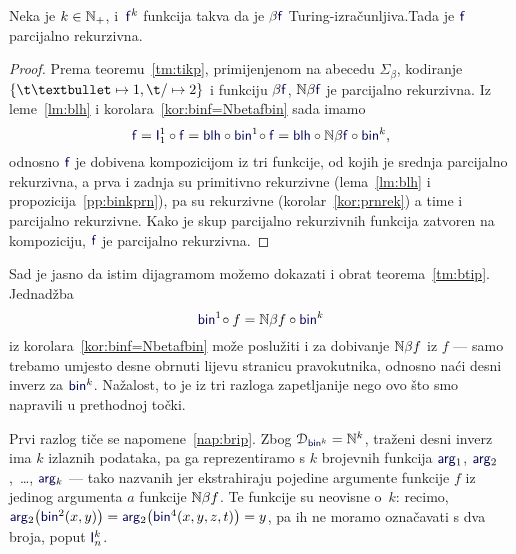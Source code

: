 
\begin{teorem}[{name=[parcijalna rekurzivnost Turing-izračunljivih brojevnih funkcija]}]\label{tm:btip}
Neka je $k\in{\mathbb N}_+$, i\, $\f f^k$\! funkcija takva da je $\beta\f f$ Turing-izračunljiva.\newline Tada je $\f f$ parcijalno rekurzivna.
\end{teorem}
\begin{proof}
    Prema teoremu~\ref{tm:tikp}, primijenjenom na abecedu $\Sigma_\beta$, kodiranje $\{\t\textbullet\mapsto1,\t/\mapsto2\}$ i funkciju $\beta\f f$, $\N\beta\f f$ je parcijalno rekurzivna. Iz leme~\ref{lm:blh} i korolara~\ref{kor:binf=Nbetafbin} sada imamo
\begin{equation}
    \f f=\f I_1^1\circ\f f=\f{blh}\circ\f{bin}^1\!\circ\f f=\f{blh}\circ\N\beta\f f\circ\f{bin}^k\text,
\end{equation}
odnosno $\f f$ je dobivena kompozicijom iz tri funkcije, od kojih je srednja parcijalno rekurzivna, a prva i zadnja su primitivno rekurzivne (lema~\ref{lm:blh} i propozicija~\ref{pp:binkprn}), pa su rekurzivne (korolar~\ref{kor:prnrek}) a time i parcijalno rekurzivne. Kako je skup parcijalno rekurzivnih funkcija zatvoren na kompoziciju, $\f f$ je parcijalno rekurzivna.
\end{proof}

Sad je jasno da istim dijagramom možemo dokazati i obrat teorema~\ref{tm:btip}. Jednadžba
\begin{equation}
    \f{bin}^1\!\circ f=\N\beta f\circ\f{bin}^k
\end{equation}
iz korolara~\ref{kor:binf=Nbetafbin} može poslužiti i za dobivanje ${\mathbb N}\beta f$ iz $f$ --- samo trebamo umjesto desne obrnuti lijevu stranicu pravokutnika, odnosno naći desni inverz za $\f{bin}^k$. Nažalost, to je iz tri razloga zapetljanije nego ovo što smo napravili u prethodnoj točki.

Prvi razlog tiče se napomene~\ref{nap:brip}. Zbog $\dom{\f{bin}^k}=\N^k$, traženi desni inverz ima $k$ izlaznih podataka, pa ga reprezentiramo s $k$ brojevnih funkcija $\f{arg}_1$, $\f{arg}_2$,~\ldots, $\f{arg}_k$ --- tako nazvanih jer ekstrahiraju pojedine argumente funkcije $f$ iz jedinog argumenta $a$ funkcije ${\mathbb N}\beta f$. Te funkcije su neovisne o~$k$: recimo, $\f{arg}_2\bigl(\f{bin}^2(x,y)\bigr)=\f{arg}_2\bigl(\f{bin}^4(x,y,z,t)\bigr)=y$, pa ih ne moramo označavati s dva broja, poput $\f I_n^k$.

